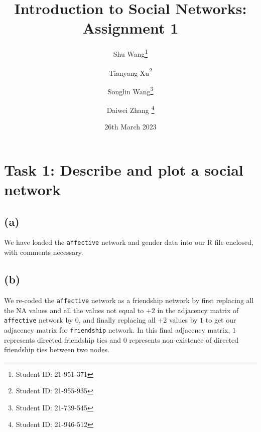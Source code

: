\documentclass[11pt]{article}
\title{Introduction to Social Networks: Assignment 1}
\author{Shu Wang\thanks{Student ID: 21-951-371 } \and Tianyang Xu\thanks{Student ID: 21-955-935} \and Songlin Wang\thanks{Student ID: 21-739-545} \and Daiwei Zhang \thanks{Student ID: 21-946-512}}
\date{26th March 2023}
\begin{document}
\maketitle

\section*{Task 1: Describe and plot a social network}

\subsection*{(a)} We have loaded the \texttt{affective} network and gender data into our R file enclosed, with comments necessary.

\subsection*{(b)} We re-coded the \texttt{affective} network as a friendship network by first replacing all the NA values and all the values not equal to $+2$ in the adjacency matrix of \texttt{affective} network by 0, and finally replacing all +2 values by $1$ to get our adjacency matrix for \texttt{friendship} network. In this final adjacency matrix, $1$ represents directed friendship ties and $0$ represents non-existence of directed friendship ties between two nodes.
\end{document}
